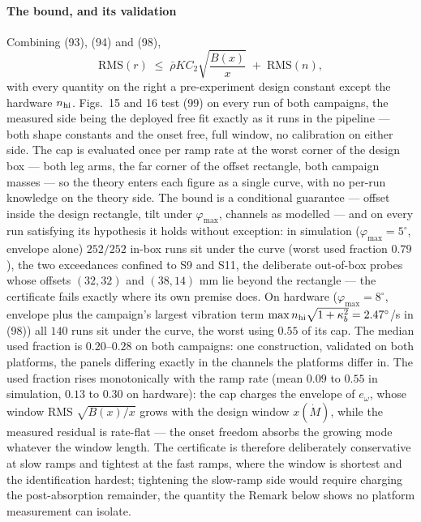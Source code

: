 \documentclass[10pt]{article}
\newcommand{\Mdot}{\dot M}
\newcommand{\rbar}{\bar\rho}
\newcommand{\rms}{\mathrm{RMS}}
\newcommand{\figboundsim}{15}
\newcommand{\figboundhw}{16}
\begin{document}
\paragraph*{The bound, and its validation}
Combining (93), (94) and (98),
\begin{equation}
  \rms(r) \;\le\;
  \rbar K C_2\sqrt{\frac{B(x)}{x}} \;+\; \rms(n),
  \tag{99}
\end{equation}
with every quantity on the right a pre-experiment design constant
except the hardware $n_{\rm hi}$. Figs.~\figboundsim{} and
\figboundhw{} test (99) on every run of both campaigns, the
measured side being the deployed free fit exactly as it runs in the
pipeline --- both shape constants and the onset free, full window,
no calibration on either side. The cap is evaluated once per ramp
rate at the worst corner of the design box --- both leg arms, the
far corner of the offset rectangle, both campaign masses --- so the
theory enters each figure as a single curve, with no per-run
knowledge on the theory side. The bound is a conditional guarantee
--- offset inside the design rectangle, tilt under
$\varphi_{\max}$, channels as modelled --- and on every run
satisfying its hypothesis it holds without exception: in simulation
($\varphi_{\max} = 5^\circ$, envelope alone) $252/252$ in-box runs
sit under the curve (worst used fraction $0.79$), the two
exceedances confined to S9 and S11, the deliberate out-of-box
probes whose offsets $(32,32)$ and $(38,14)$ mm lie beyond the
rectangle --- the certificate fails exactly where its own premise
does. On hardware ($\varphi_{\max} = 8^\circ$, envelope plus the
campaign's largest vibration term $\max n_{\rm hi}\sqrt{1 +
\kappa_b^2} = 2.47^\circ$/s in (98)) all $140$ runs
sit under the curve, the worst using $0.55$ of its cap. The median used fraction
is $0.20$--$0.28$ on both campaigns: one construction, validated on
both platforms, the panels differing exactly in the channels the
platforms differ in. The used fraction rises monotonically with the
ramp rate (mean $0.09$ to $0.55$ in simulation, $0.13$ to $0.30$ on
hardware): the cap charges the envelope of $e_\omega$, whose window
RMS $\sqrt{B(x)/x}$ grows with the design window $x(\Mdot)$, while
the measured residual is rate-flat --- the onset freedom absorbs
the growing mode whatever the window length. The certificate is
therefore deliberately conservative at slow ramps and tightest at
the fast ramps, where the window is shortest and the identification
hardest; tightening the slow-ramp side would require charging the
post-absorption remainder, the quantity the Remark below shows no
platform measurement can isolate.
\end{document}
